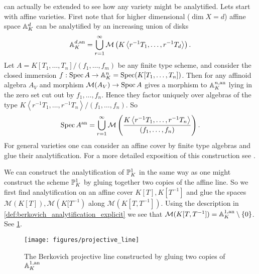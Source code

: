 \begin{example}
	 can actually be extended to see how any variety might be analytified. 
	Lets start with affine varieties. 
	First note that for higher dimensional ($\dim X = d$) affine space $\mathbb{A}_K^{d}$ can be analytified by an increasing union of disks \[
		\mathbb{A}_K^{d, \text{an}} = \bigcup_{r = 1} ^{\infty} \mathcal{M} \left(K \left<r^{-1} T_1, \ldots, r^{-1} T_d \right>\right)
	.\] 
	Let $A = K[T_1,\ldots, T_n] / (f_1, \ldots, f_m)$ be any finite type scheme, and consider the closed immersion $f: \operatorname{Spec} A \to \mathbb{A}_K^{n} = \operatorname{Spec} (K[T_1, \ldots, T_n]) $. 
	Then for any affinoid algebra $A_V$ and morphism $\mathcal{M} (A_V) \to \operatorname{Spec} A$ gives a morphism to $\mathbb{A}_K^{n, \text{an}}$ lying in the zero set cut out by $f_1, \ldots, f_n$. Hence they factor uniquely over algebras of the type $K \left<r^{-1} T_1, \ldots, r^{-1} T_n \right>/ (f_1, \ldots, f_n)$. 
	So \[
		\operatorname{Spec} A {}^{\text{an}} = \bigcup_{r= 1} ^{\infty} \mathcal{M} \left(\frac{K \left<r^{-1} T_1, \ldots, r^{-1} T_n \right>}{(f_1, \ldots, f_n)}\right)
	.\] 
	For general varieties one can consider an affine cover by finite type algebras and glue their analytification. 
	For a more detailed exposition of this construction see \cite[sec.\ 3.4]{berkovichSpectralTheoryAnalytic2012}. 
\end{example}

\begin{example}
	We can construct the analytification of $\mathbb{P}^{1}_K$ in the same way as one might construct the scheme $\mathbb{P}^{1}_K$ by gluing together two copies of the affine line. 
	So we first find analytification on an affine cover $K[T], K[T^{-1}]$ and glue the spaces $\mathcal{M} (K[T]), \mathcal{M} (K[T^{-1})$ along $\mathcal{M} (K[T, T^{-1}])$. 
Using the description in \cref{def:berkovich_analytification_explicit} we see that $\mathcal{M} (K[T, T^{-1}]) = \mathbb{A}^{1, \text{an}}_K \setminus \{0\} $.
See \cref{fig:berk_projective_line}. 
\end{example}

\begin{figure}[h]
	\centering
	\texttt{[image: figures/projective\_line]}
	\caption{The Berkovich projective line constructed by gluing two copies of $\mathbb{A}^{1, \text{an}}_K$}
	\label{fig:berk_projective_line}
\end{figure}


